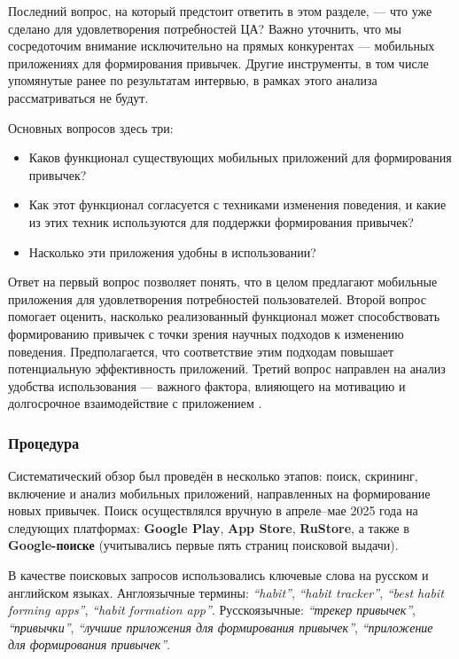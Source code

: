 \documentclass[pdflatex,sn-mathphys-num]{sn-jnl}%
\theoremstyle{thmstyleone}%
\theoremstyle{thmstyletwo}%
\theoremstyle{thmstylethree}%
\begin{document}
Последний вопрос, на который предстоит ответить в этом разделе, — что уже сделано для удовлетворения потребностей ЦА? Важно уточнить, что мы сосредоточим внимание исключительно на прямых конкурентах — мобильных приложениях для формирования привычек. Другие инструменты, в том числе упомянутые ранее по результатам интервью, в рамках этого анализа рассматриваться не будут.

Основных вопросов здесь три:

\begin{itemize}
    \item Каков функционал существующих мобильных приложений для формирования привычек?
    \item Как этот функционал согласуется с техниками изменения поведения, и какие из этих техник используются для поддержки формирования привычек?
    \item Насколько эти приложения удобны в использовании?
\end{itemize}

Ответ на первый вопрос позволяет понять, что в целом предлагают мобильные приложения для удовлетворения потребностей пользователей. Второй вопрос помогает оценить, насколько реализованный функционал может способствовать формированию привычек с точки зрения научных подходов к изменению поведения. Предполагается, что соответствие этим подходам повышает потенциальную эффективность приложений. Третий вопрос направлен на анализ удобства использования — важного фактора, влияющего на мотивацию и долгосрочное взаимодействие с приложением \cite{Biduski2020Assessing}.

\subsubsection{Процедура}

Систематический обзор был проведён в несколько этапов: поиск, скрининг, включение и анализ мобильных приложений, направленных на формирование новых привычек. Поиск осуществлялся вручную в апреле–мае 2025 года на следующих платформах: \textbf{Google Play}, \textbf{App Store}, \textbf{RuStore}, а также в \textbf{Google-поиске} (учитывались первые пять страниц поисковой выдачи).

В качестве поисковых запросов использовались ключевые слова на русском и английском языках. Англоязычные термины: \textit{“habit”}, \textit{“habit tracker”}, \textit{“best habit forming apps”}, \textit{“habit formation app”}. Русскоязычные: \textit{“трекер привычек”}, \textit{“привычки”}, \textit{“лучшие приложения для формирования привычек”}, \textit{“приложение для формирования привычек”}.
\end{document}

